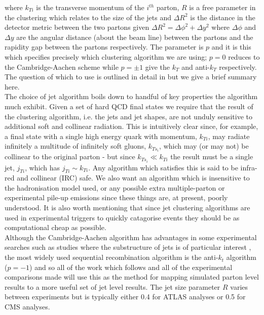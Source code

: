 	where $k_{Ti}$ is the transverse momentum of the $i^{th}$ parton, $R$ is a free parameter in the clustering which relates
	to the size of the jets and $\Delta R^2$ is the distance in the detector metric between the two partons given
	$\Delta R^2 = \Delta\phi^2 + \Delta y^2$ where $\Delta\phi$ and $\Delta y$ are the angular distance (about the beam line)
	between the partons and the rapidity gap between the partons respectively.  The parameter is $p$ and it is this which
	specifies precisely which clustering algorithm we are using; $p=0$ reduces to the Cambridge-Aachen scheme while
	$p=\pm1$ give the $k_T$ and anti-$k_T$ respectively.  The question of which to use is outlined in detail in
	\cite{Cacciari:2008gp} but we give a brief summary here.\\The choice of jet algorithm boils down to handful of key
	properties the algorithm much exhibit.  Given a set of hard QCD final states we require that the result of the
	clustering algorithm, i.e. the jets and jet shapes, are not unduly sensitive to additional soft and collinear radiation.
	This is intuitively clear since, for example, a final state with a single high energy quark with momentum, $k_{Ti}$,
	may radiate infinitely a multitude of infinitely soft gluons, $k_{Ts_i}$, which may (or may not) be collinear to the
	original parton - but since $k_{Ts_i}\ll k_{Ti}$ the result must be a single jet, $j_{Ti}$, which has $j_{Ti}\sim k_{Ti}$.
	Any algorithm which satisfies this is said to be infra-red and collinear (IRC) safe.  We also want an algorithm which
	is insensitive to the hadronisation model used, or any possible extra multiple-parton or experimental pile-up emissions
	since these things are, at present, poorly understood.  It is also worth mentioning that since jet clustering algorithms
	are used in experimental triggers to quickly catagorise events they should be as computational cheap as possible.\\Although
	the Cambridge-Aachen algorithm has advantages in some experimental searches such as studies where the substructure of
	jets is of particular interest \cite{Butterworth:2008iy, Aad:2015owa}, the most widely used sequential recombination algorithm is
	the anti-$k_t$ algorithm ($p=-1$) and so all of the work which follows and all of the experimental comparisons made will
	use this as the method for mapping simulated parton level results to a more useful set of jet level results.  The jet size
	parameter $R$ varies between experiments but is typically either 0.4 for ATLAS analyses or 0.5 for CMS analyses.

